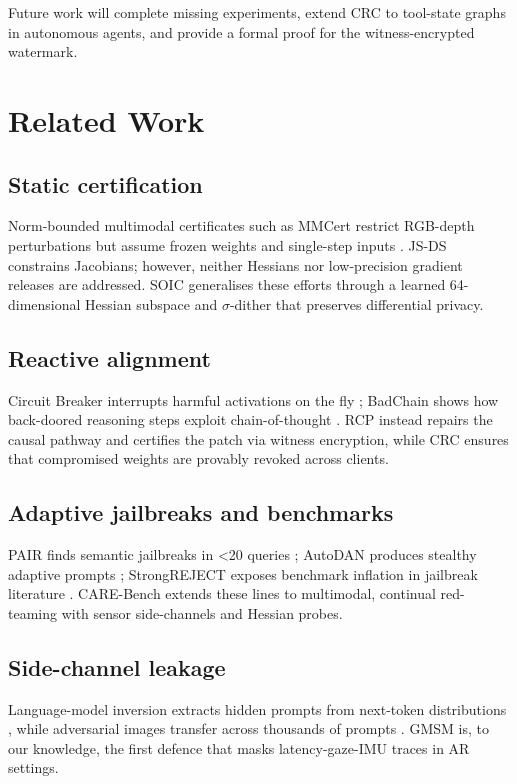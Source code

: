 \documentclass{article}
\begin{document}
Future work will complete missing experiments, extend CRC to tool-state graphs in autonomous agents, and provide a formal proof for the witness-encrypted watermark.

\section{Related Work}
\subsection{Static certification}
Norm-bounded multimodal certificates such as MMCert restrict RGB-depth perturbations but assume frozen weights and single-step inputs \cite{wang-2024-mmcert}. JS-DS constrains Jacobians; however, neither Hessians nor low-precision gradient releases are addressed. SOIC generalises these efforts through a learned 64-dimensional Hessian subspace and $\sigma$-dither that preserves differential privacy.

\subsection{Reactive alignment}
Circuit Breaker interrupts harmful activations on the fly \cite{zou-2024-improving}; BadChain shows how back-doored reasoning steps exploit chain-of-thought \cite{xiang-2024-badchain}. RCP instead repairs the causal pathway and certifies the patch via witness encryption, while CRC ensures that compromised weights are provably revoked across clients.

\subsection{Adaptive jailbreaks and benchmarks}
PAIR finds semantic jailbreaks in <20 queries \cite{chao-2023-jailbreaking}; AutoDAN produces stealthy adaptive prompts \cite{liu-2023-autodan}; StrongREJECT exposes benchmark inflation in jailbreak literature \cite{souly-2024-strongreject}. CARE-Bench extends these lines to multimodal, continual red-teaming with sensor side-channels and Hessian probes.

\subsection{Side-channel leakage}
Language-model inversion extracts hidden prompts from next-token distributions \cite{morris-2023-language}, while adversarial images transfer across thousands of prompts \cite{luo-2024-image}. GMSM is, to our knowledge, the first defence that masks latency-gaze-IMU traces in AR settings.
\end{document}
